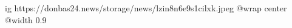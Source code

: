  
 
 
 
 

\ifcmt
  ig https://donbas24.news/storage/news/lzin8n6e9s1cilxk.jpeg
  @wrap center
  @width 0.9
\fi
